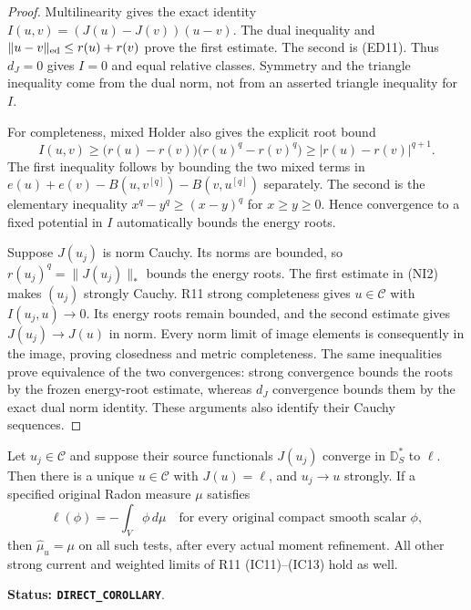 \begin{proof}
Multilinearity gives the exact identity
$I(u,v)=(J(u)-J(v))(u-v)$. The dual inequality and
$\|u-v\|_{\rm ed}\leq r(u)+r(v)$ prove the first estimate.
The second is (ED11). Thus $d_J=0$ gives $I=0$ and equal
relative classes. Symmetry and the triangle inequality come
from the dual norm, not from an asserted triangle inequality
for $I$.

For completeness, mixed Holder also gives the explicit root bound
\[
 I(u,v)\geq\bigl(r(u)-r(v)\bigr)
                   \bigl(r(u)^q-r(v)^q\bigr)
                \geq|r(u)-r(v)|^{q+1}.
\]
The first inequality follows by bounding the two mixed terms in
$e(u)+e(v)-B(u,v^{[q]})-B(v,u^{[q]})$ separately. The second
is the elementary inequality $x^q-y^q\geq(x-y)^q$ for
$x\geq y\geq0$. Hence convergence to a fixed potential in
$I$ automatically bounds the energy roots.

Suppose $J(u_j)$ is norm Cauchy. Its norms are bounded, so
$r(u_j)^q=\|J(u_j)\|_*$ bounds the energy roots. The first
estimate in (NI2) makes $(u_j)$ strongly Cauchy. R11 strong
completeness gives $u\in\mathscr C$ with $I(u_j,u)\to0$.
Its energy roots remain bounded, and the second estimate gives
$J(u_j)\to J(u)$ in norm. Every norm limit of image elements
is consequently in the image, proving closedness and metric
completeness. The same inequalities prove equivalence of the
two convergences: strong convergence bounds the roots by the
frozen energy-root estimate, whereas $d_J$ convergence bounds
them by the exact dual norm identity. These arguments also
identify their Cauchy sequences.
\end{proof}

\begin{corollary}
\label{cor:r12-original-source-approximation}
Let $u_j\in\mathscr C$ and suppose their source functionals
$J(u_j)$ converge in $\mathbb D_S^*$ to $\ell$. Then there is
a unique $u\in\mathscr C$ with $J(u)=\ell$, and $u_j\to u$
strongly. If a specified original Radon measure $\mu$ satisfies
\[
                 \ell(\phi)=-\int_V\phi\,d\mu
            \quad\text{for every original compact smooth scalar }\phi,
 \tag{NI3}
\]
then $\widehat\mu_u=\mu$ on all such tests, after every actual
moment refinement. All other strong current and weighted limits
of R11 (IC11)--(IC13) hold as well.
\end{corollary}

\noindent\textbf{Status: \texttt{DIRECT\_COROLLARY}}.

